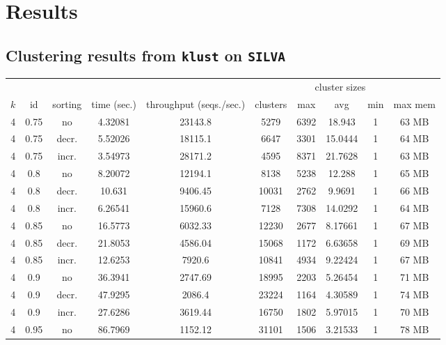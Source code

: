\section{Results}

\subsection{Clustering results from \texttt{klust} on \texttt{SILVA}}
\label{app:klust_data_parameters}

\begingroup
\setlength{\LTleft}{-20cm plus -1fill}
\setlength{\LTright}{\LTleft}
\begin{longtable}{c|c|c|c|c|c|c|c|c|c}
  & & & & & &\multicolumn{3}{c|}{cluster sizes} & \\
  $k$ & id & sorting & time (sec.) & throughput (seqs./sec.) & clusters & max & avg & min & max mem \\
  \hline \hline
  4  &  0.75  & no    & 4.32081  &  23143.8 &  5279   &  6392  &  18.943   &  1  & 63  MB \\
  4  &  0.75  & decr. & 5.52026  &  18115.1 &  6647   &  3301  &  15.0444  &  1  & 64  MB \\
  4  &  0.75  & incr. & 3.54973  &  28171.2 &  4595   &  8371  &  21.7628  &  1  & 63  MB \\
  \hline
  4  &  0.8   & no    & 8.20072  &  12194.1 &  8138   &  5238  &  12.288   &  1  & 65  MB \\
  4  &  0.8   & decr. & 10.631   &  9406.45 &  10031  &  2762  &  9.9691   &  1  & 66  MB \\
  4  &  0.8   & incr. & 6.26541  &  15960.6 &  7128   &  7308  &  14.0292  &  1  & 64  MB \\
  \hline
  4  &  0.85  & no    & 16.5773  &  6032.33 &  12230  &  2677  &  8.17661  &  1  & 67  MB \\
  4  &  0.85  & decr. & 21.8053  &  4586.04 &  15068  &  1172  &  6.63658  &  1  & 69  MB \\
  4  &  0.85  & incr. & 12.6253  &  7920.6  &  10841  &  4934  &  9.22424  &  1  & 67  MB \\
  \hline
  4  &  0.9   & no    & 36.3941  &  2747.69 &  18995  &  2203  &  5.26454  &  1  & 71  MB \\
  4  &  0.9   & decr. & 47.9295  &  2086.4  &  23224  &  1164  &  4.30589  &  1  & 74  MB \\
  4  &  0.9   & incr. & 27.6286  &  3619.44 &  16750  &  1802  &  5.97015  &  1  & 70  MB \\
  \hline
  4  &  0.95  & no    & 86.7969  &  1152.12 &  31101  &  1506  &  3.21533  &  1  & 78  MB \\

\end{longtable}
